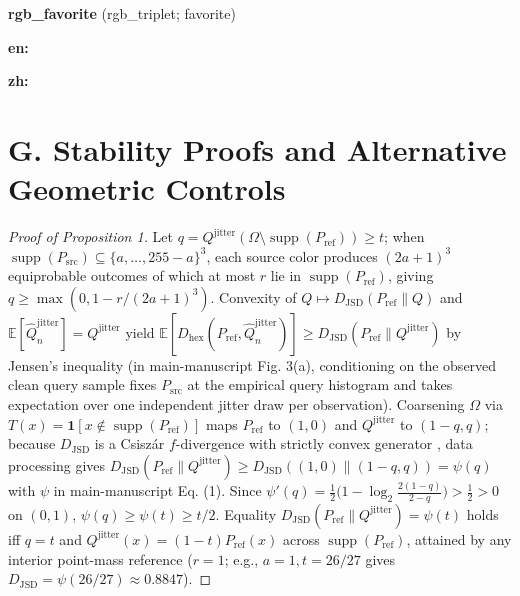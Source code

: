 \documentclass[10pt,letterpaper]{article}
\theoremstyle{definition}
\newcommand{\Dhex}{D_{\mathrm{hex}}}
\begin{document}
\textbf{rgb\_favorite} (rgb\_triplet; favorite)


{\raggedright\noindent\textbf{en:}\par}


{\raggedright\noindent\textbf{zh:}\par}


\section*{G. Stability Proofs and Alternative Geometric Controls}

\begin{proof}[Proof of Proposition 1]

Let $q=Q^{\mathrm{jitter}}(\Omega\setminus\operatorname{supp}(P_{\mathrm{ref}}))\ge t$; when $\operatorname{supp}(P_{\mathrm{src}})\subseteq\{a,\ldots,255-a\}^3$, each source color produces $(2a+1)^3$ equiprobable outcomes of which at most $r$ lie in $\operatorname{supp}(P_{\mathrm{ref}})$, giving $q\ge\max(0,1-r/(2a+1)^3)$. Convexity of $Q\mapsto D_{\mathrm{JSD}}(P_{\mathrm{ref}}\|Q)$ \cite{ref26} and $\mathbb E[\hat Q_n^{\mathrm{jitter}}]=Q^{\mathrm{jitter}}$ yield $\mathbb E[\Dhex{}(P_{\mathrm{ref}},\hat Q_n^{\mathrm{jitter}})]\ge D_{\mathrm{JSD}}(P_{\mathrm{ref}}\|Q^{\mathrm{jitter}})$ by Jensen's inequality (in main-manuscript Fig. 3(a), conditioning on the observed clean query sample fixes $P_{\mathrm{src}}$ at the empirical query histogram and takes expectation over one independent jitter draw per observation). Coarsening $\Omega$ via $T(x)=\mathbf 1[x\notin\operatorname{supp}(P_{\mathrm{ref}})]$ maps $P_{\mathrm{ref}}$ to $(1,0)$ and $Q^{\mathrm{jitter}}$ to $(1-q,q)$; because $D_{\mathrm{JSD}}$ is a Csisz\'{a}r $f$-divergence with strictly convex generator \cite{ref33}, data processing gives $D_{\mathrm{JSD}}(P_{\mathrm{ref}}\|Q^{\mathrm{jitter}})\ge D_{\mathrm{JSD}}((1,0)\|(1-q,q))=\psi(q)$ with $\psi$ in main-manuscript Eq. (1). Since $\psi'(q)=\tfrac12\big(1-\log_2\tfrac{2(1-q)}{2-q}\big)>\tfrac12>0$ on $(0,1)$, $\psi(q)\ge\psi(t)\ge t/2$. Equality $D_{\mathrm{JSD}}(P_{\mathrm{ref}}\|Q^{\mathrm{jitter}})=\psi(t)$ holds iff $q=t$ and $Q^{\mathrm{jitter}}(x)=(1-t)P_{\mathrm{ref}}(x)$ across $\operatorname{supp}(P_{\mathrm{ref}})$, attained by any interior point-mass reference ($r=1$; e.g., $a=1, t=26/27$ gives $D_{\mathrm{JSD}}=\psi(26/27)\approx 0.8847$).\end{proof}
\end{document}
